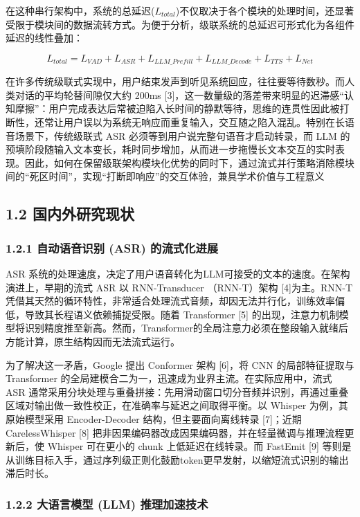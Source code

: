 \documentclass[UTF8,a4paper,12pt]{ctexart}
\begin{document}
在这种串行架构中，系统的总延迟($L_{total}$)不仅取决于各个模块的处理时间，还显著受限于模块间的数据流转方式。为便于分析，级联系统的总延迟可形式化为各组件延迟的线性叠加：

\[
L_{total} = L_{VAD} + L_{ASR} + L_{LLM\_Prefill} + L_{LLM\_Decode} + L_{TTS} + L_{Net}
\]


在许多传统级联式实现中，用户结束发声到听见系统回应，往往要等待数秒。而人类对话的平均轮替间隙仅大约 200ms [3]，这一数量级的落差带来明显的迟滞感“认知摩擦”：用户完成表达后常被迫陷入长时间的静默等待，思维的连贯性因此被打断性，还常让用户误以为系统无响应而重复输入，交互随之陷入混乱。特别在长语音场景下，传统级联式 ASR 必须等到用户说完整句语音才启动转录，而 LLM 的预填阶段随输入文本变长，耗时同步增加，从而进一步拖慢长文本交互的实时表现。因此，如何在保留级联架构模块化优势的同时下，通过流式并行策略消除模块间的“死区时间”，实现“打断即响应”的交互体验，兼具学术价值与工程意义

\subsection*{1.2 国内外研究现状}


\subsubsection*{1.2.1 自动语音识别 (ASR) 的流式化进展}


ASR 系统的处理速度，决定了用户语音转化为LLM可接受的文本的速度。在架构演进上，早期的流式 ASR 以 RNN-Transducer （RNN-T）架构 [4]为主。RNN-T 凭借其天然的循环特性，非常适合处理流式音频，却因无法并行化，训练效率偏低，导致其长程语义依赖捕捉受限。随着 Transformer [5] 的出现，注意力机制模型将识别精度推至新高。然而，Transformer的全局注意力必须在整段输入就绪后方能计算，原生结构因而无法流式运行。

为了解决这一矛盾，Google 提出 Conformer 架构 [6]，将 CNN 的局部特征提取与 Transformer 的全局建模合二为一，迅速成为业界主流。在实际应用中，流式 ASR 通常采用分块处理与重叠拼接：先用滑动窗口切分音频并识别，再通过重叠区域对输出做一致性校正，在准确率与延迟之间取得平衡。以 Whisper 为例，其原始模型采用 Encoder-Decoder 结构，但主要面向离线转录 [7]；近期 CarelessWhisper [8] 把非因果编码器改成因果编码器，并在轻量微调与推理流程更新后，使 Whisper 可在更小的 chunk 上低延迟在线转录。而 FastEmit [9] 等则是从训练目标入手，通过序列级正则化鼓励token更早发射，以缩短流式识别的输出滞后时长。

\subsubsection*{1.2.2 大语言模型 (LLM) 推理加速技术}
\end{document}
